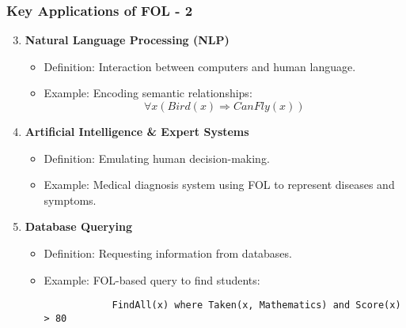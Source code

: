 \documentclass[aspectratio=169]{beamer}
\begin{document}
\begin{frame}[fragile]
    \frametitle{Key Applications of FOL - 2}
    
    \begin{enumerate}
        \setcounter{enumi}{2}
        \item \textbf{Natural Language Processing (NLP)}
        \begin{itemize}
            \item Definition: Interaction between computers and human language.
            \item Example: Encoding semantic relationships:
            \begin{equation}
            \forall x (Bird(x) \Rightarrow CanFly(x))
            \end{equation}
        \end{itemize}
        
        \item \textbf{Artificial Intelligence & Expert Systems}
        \begin{itemize}
            \item Definition: Emulating human decision-making.
            \item Example: Medical diagnosis system using FOL to represent diseases and symptoms.
        \end{itemize}
        
        \item \textbf{Database Querying}
        \begin{itemize}
            \item Definition: Requesting information from databases.
            \item Example: FOL-based query to find students:
            \begin{lstlisting}
            FindAll(x) where Taken(x, Mathematics) and Score(x) > 80
            \end{lstlisting}
        \end{itemize}
    \end{enumerate}
\end{frame}
\end{document}
